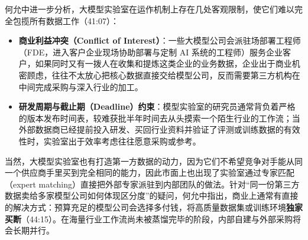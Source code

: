 \documentclass[UTF8,a4paper,11pt,fontset=fandol]{ctexart}
\begin{document}
何允中进一步分析，大模型实验室在运作机制上存在几处客观限制，使它们难以完全包揽所有数据工作（41:07）：
\begin{itemize}
\item \textbf{商业利益冲突（Conflict of Interest）}：一些大模型公司会派驻场部署工程师（FDE，进入客户企业现场协助部署与定制 AI 系统的工程师）服务企业客户，如果同时又有一拨人在收集和提炼这类企业的业务数据，企业出于商业机密顾虑，往往不太放心把核心数据直接交给模型公司，反而需要第三方机构在中间完成采购与深入行业的加工。
\item \textbf{研发周期与截止期（Deadline）约束}：模型实验室的研究员通常背负着严格的版本发布时间表，较难获批半年时间去从头摸索一个陌生行业的工作流；当外部数据商已经提前投入研发、买回行业资料并验证了评测或训练数据的有效性时，实验室出于效率考虑往往愿意采购或参考。
\end{itemize}

当然，大模型实验室也有打造第一方数据的动力，因为它们不希望竞争对手能从同一个供应商手里买到完全相同的能力，因此市面上也出现了实验室通过专家匹配（expert matching）直接把外部专家派驻到内部团队的做法。针对“同一份第三方数据卖给多家模型公司如何体现区分度”的疑问，何允中指出，商业上通常有直接的解决方式：预算充足的模型公司会选择多付钱，将高质量数据集或训练环境\textbf{独家买断}（44:15）。在海量行业工作流尚未被蒸馏完毕的阶段，内部自建与外部采购将会长期并行。
\end{document}
